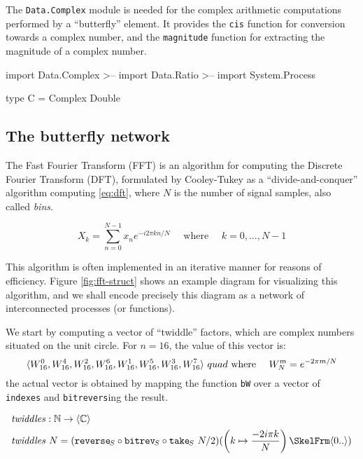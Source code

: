 The \texttt{Data.Complex} module is needed for the complex arithmetic computations performed by a ``butterfly'' element. It provides the \texttt{cis} function for conversion towards a complex number, and the \texttt{magnitude} function for extracting the magnitude of a complex number.

\begin{code}
import Data.Complex
>-- import Data.Ratio
>-- import System.Process
\end{code}

\begin{code}
type C = Complex Double
\end{code}

\subsection{The butterfly network}
\label{sec:butterfly-network}

The Fast Fourier Transform (FFT) is an algorithm for computing the Discrete Fourier Transform (DFT), formulated by Cooley-Tukey as a ``divide-and-conquer'' algorithm computing \eqref{eq:dft}, where $N$ is the number of signal samples, also called \emph{bins}.

\begin{equation}\label{eq:dft}
  X_k = \sum_{n=0}^{N-1}x_n e^{-i2\pi k n / N}\quad\text{ where }\quad k=0,...,N-1 
\end{equation}

This algorithm is often implemented in an iterative manner for reasons of efficiency. Figure \ref{fig:fft-struct} shows an example diagram for visualizing this algorithm, and we shall encode precisely this diagram as a network of interconnected processes (or functions).

We start by computing a vector of ``twiddle'' factors, which are complex numbers situated on the unit circle. For $n=16$, the value of this vector is:
\begin{equation}\label{eq:twiddles}
  \langle{W_{16}^0,W_{16}^4,W_{16}^2,W_{16}^6,W_{16}^1,W_{16}^5,W_{16}^3,W_{16}^7}\rangle
\ quad\text{ where }\quad W_{N}^m = e^{-2\pi m / N}
\end{equation}
the actual vector is obtained by mapping the function \texttt{bW} over a vector of \texttt{indexes} and \texttt{bitrevers}ing the result.

\begin{equation}\label{eq:1}
  \begin{aligned}
  &\id{twiddles} : \mathbb{N} \rightarrow \SkelVec{\mathbb{C}}\\
  &\id{twiddles}\ N = (\SkelCons{reverse} \circ \SkelCons{bitrev} \circ \SkelCons{take}\ {N/2}) (\left(k \mapsto\frac{-2i\pi k}{N}\right)  \SkelFrm \SkelVec{0..})
\end{aligned}
\end{equation}

